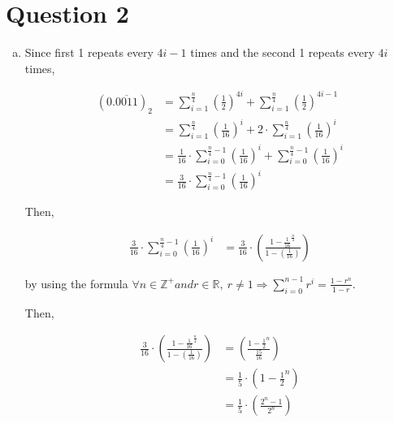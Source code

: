 \documentclass[12pt]{article}
\begin{document}
\section*{Question 2}
\begin{enumerate}[a.]
    \item

    Since first 1 repeats every $4i - 1$ times and the second 1 repeats every $4i$ times,

    \setcounter{equation}{0}
    \begin{align}
        (0.\overline{0011})_2 &= \sum\limits_{i=1}^{\frac{n}{4}} \left( \frac{1}{2} \right)^{4i} + \sum\limits_{i=1}^{\frac{n}{4}} \left( \frac{1}{2} \right)^{4i-1}\\
        &= \sum\limits_{i=1}^{\frac{n}{4}} \left( \frac{1}{16} \right)^{i} + 2 \cdot \sum\limits_{i=1}^{\frac{n}{4}} \left( \frac{1}{16} \right)^{i}\\
        &= \frac{1}{16} \cdot \sum\limits_{i=0}^{\frac{n}{4} - 1} \left( \frac{1}{16} \right)^{i} + \sum\limits_{i=0}^{\frac{n}{4}-1} \left( \frac{1}{16} \right)^{i}\\
        &= \frac{3}{16} \cdot \sum\limits_{i=0}^{\frac{n}{4} - 1} \left( \frac{1}{16} \right)^{i}
    \end{align}

    \bigskip

    Then,

    \begin{align}
        \frac{3}{16} \cdot \sum\limits_{i=0}^{\frac{n}{4} - 1} \left( \frac{1}{16} \right)^{i} &= \frac{3}{16} \cdot \left(\frac{1 - \frac{1}{16}^{\frac{n}{4}}}{1 - (\frac{1}{16})} \right)
    \end{align}

    by using the formula $\forall n \in \mathbb{Z}^{+} and r \in \mathbb{R},\: r \neq 1 \Rightarrow \sum\limits_{i=0}^{n-1} r^i = \frac{1-r^n}{1 - r}$.

    \bigskip

    Then,

    \begin{align}
        \frac{3}{16} \cdot \left(\frac{1 - \frac{1}{16}^{\frac{n}{4}}}{1 - (\frac{1}{16})} \right) &= (\frac{1 - \frac{1}{2}^n}{\frac{15}{16}})\\
        &= \frac{1}{5} \cdot \left( 1 - \frac{1}{2}^n \right)\\
        &= \frac{1}{5} \cdot \left( \frac{2^n - 1}{2^n} \right)
    \end{align}


\end{enumerate}
\end{document}
